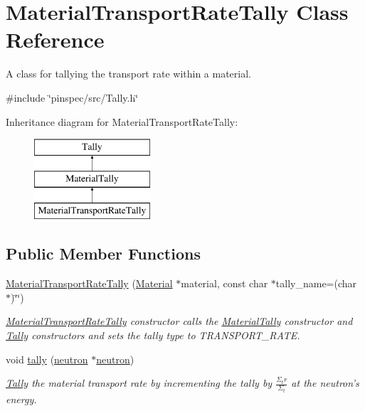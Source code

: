 \hypertarget{classMaterialTransportRateTally}{\section{Material\-Transport\-Rate\-Tally Class Reference}
\label{classMaterialTransportRateTally}
}


A class for tallying the transport rate within a material.  




{\ttfamily \#include \char`\"{}pinspec/src/\-Tally.\-h\char`\"{}}

Inheritance diagram for Material\-Transport\-Rate\-Tally\-:\begin{figure}[H]
\begin{center}
\leavevmode
\includegraphics[height=3.000000cm]{classMaterialTransportRateTally}
\end{center}
\end{figure}
\subsection*{Public Member Functions}
\begin{DoxyCompactItemize}
\item 
\hyperlink{classMaterialTransportRateTally_afbb8c05e018128d52093e615cadf1b1d}{Material\-Transport\-Rate\-Tally} (\hyperlink{classMaterial}{Material} $\ast$material, const char $\ast$tally\-\_\-name=(char $\ast$)\char`\"{}\char`\"{})
\begin{DoxyCompactList}\small\item\em \hyperlink{classMaterialTransportRateTally}{Material\-Transport\-Rate\-Tally} constructor calls the \hyperlink{classMaterialTally}{Material\-Tally} constructor and \hyperlink{classTally}{Tally} constructors and sets the tally type to T\-R\-A\-N\-S\-P\-O\-R\-T\-\_\-\-R\-A\-T\-E. \end{DoxyCompactList}\item 
void \hyperlink{classMaterialTransportRateTally_a10c3aa96348177a1002395295d51c90a}{tally} (\hyperlink{structneutron}{neutron} $\ast$\hyperlink{structneutron}{neutron})
\begin{DoxyCompactList}\small\item\em \hyperlink{classTally}{Tally} the material transport rate by incrementing the tally by $ \frac{\Sigma_tr}{\Sigma_t} $ at the neutron's energy. \end{DoxyCompactList}\end{DoxyCompactItemize}
